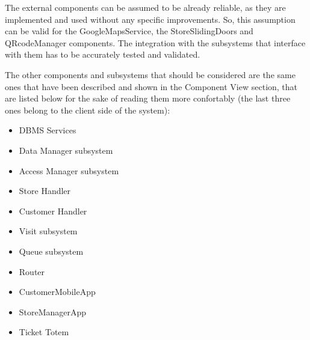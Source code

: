 \documentclass[]{article}
\begin{document}
The external components can be assumed to be already reliable, as they are implemented and used without any specific improvements. So, this assumption can be valid for the GoogleMapsService, the StoreSlidingDoors and QRcodeManager components. The integration with the subsystems that interface with them has to be accurately tested and validated.\newline

The other components and subsystems that should be considered are the same ones that have been described and shown in the Component View section, that are listed below for the sake of reading them more confortably (the last three ones belong to the client side of the system):
				\begin{itemize}
					\item DBMS Services
					\item Data Manager subsystem
					\item Access Manager subsystem
					\item Store Handler
					\item Customer Handler
					\item Visit subsystem
					\item Queue subsystem
					\item Router
					\item CustomerMobileApp
					\item StoreManagerApp
					\item Ticket Totem
				\end{itemize}
\end{document}
